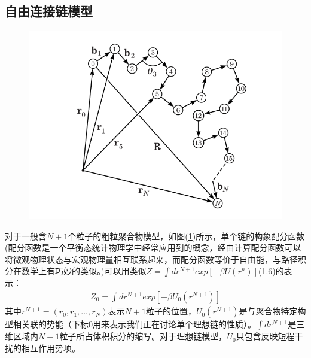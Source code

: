 \subsection{自由连接链模型}
\begin{figure}[H]
	\centering   
	\includegraphics[width=12cm]{./figures/2-1.png}
	\caption{ }
	\label{2.1}
\end{figure}

对于一般含$N+1$个粒子的粗粒聚合物模型，如图(\ref{2.1})所示，单个链的构象配分函数(配分函数是一个平衡态统计物理学中经常应用到的概念，经由计算配分函数可以将微观物理状态与宏观物理量相互联系起来，而配分函数等价于自由能，与路径积分在数学上有巧妙的类似。)可以用类似$Z=\int dr^{N+1}exp[-\beta U(r^{n})]$(1.6)的表示：\\
\begin{gather}
Z_0 = \int dr^{N+1}exp[-\beta U_{0}(r^{N+1})]
\label{2.3}
\end{gather}
其中$r^{N+1}=(r_0,r_1,\ldots,r_{N})$表示$N+1$粒子的位置，$U_0(r^{N+1})$是与聚合物特定构型相关联的势能（下标$0$用来表示我们正在讨论单个理想链的性质）。$\int dr^{N+1}$是三维区域内$N+1$粒子所占体积积分的缩写。对于理想链模型，$U_0$只包含反映短程干扰的相互作用势项。\\

